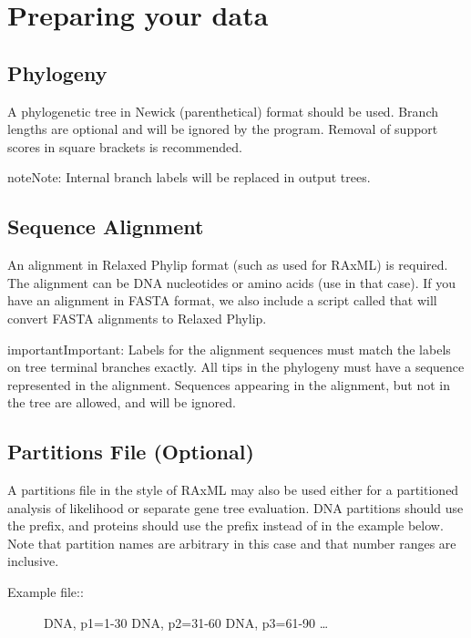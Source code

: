 \documentclass[letterpaper,12pt,english]{sphinxmanual}
\begin{document}
\section{Preparing your data}
\label{\detokenize{intro:preparing-your-data}}

\subsection{Phylogeny}
\label{\detokenize{intro:phylogeny}}
A phylogenetic tree in Newick (parenthetical) format should be used.  Branch lengths are optional and will be ignored by the program.  Removal of support scores in square brackets is recommended.

\begin{sphinxadmonition}{note}{Note:}
Internal branch labels will be replaced in output trees.
\end{sphinxadmonition}


\subsection{Sequence Alignment}
\label{\detokenize{intro:sequence-alignment}}
An alignment in Relaxed Phylip format (such as used for RAxML) is required.  The alignment can be DNA nucleotides or amino acids (use  in that case). If you have an alignment in FASTA format, we also include a script called  that will convert FASTA alignments to Relaxed Phylip.

\begin{sphinxadmonition}{important}{Important:}
Labels for the alignment sequences must match the labels on tree terminal branches exactly. All tips in the phylogeny must have a sequence represented in the alignment.  Sequences appearing in the alignment, but not in the tree are allowed, and will be ignored.
\end{sphinxadmonition}


\subsection{Partitions File (Optional)}
\label{\detokenize{intro:partitions-file-optional}}
A partitions file in the style of RAxML may also be used either for a partitioned analysis of likelihood or separate gene tree evaluation.  DNA partitions should use the  prefix, and proteins should use the  prefix instead of  in the example below.  Note that partition names are arbitrary in this case and that number ranges are inclusive.
\begin{description}
\item[{Example file::}] \leavevmode
DNA, p1=1-30
DNA, p2=31-60
DNA, p3=61-90
…

\end{description}
\end{document}
